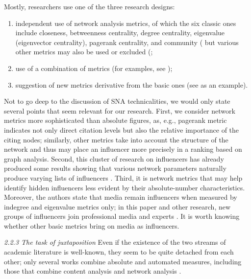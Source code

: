Mostly, researchers use one of the three research designs:
\begin{enumerate}
	\item independent use of network analysis metrics, of which the six classic ones include closeness, betweenness centrality, degree centrality, eigenvalue (eigenvector centrality), pagerank centrality, and community (\cite{DuboisGaffney,SanzMenendez} but various other metrics may also be used or excluded (\cite{DuboisGaffney,AlmindIngwersen,BlekanovMoskalets};
	\item use of a combination of metrics (for examples, see \cite{KwakLeePark,GonzalezBailonBorgeHolthoeferMoreno});
	\item suggestion of new metrics derivative from the basic ones (see \cite{MairederWeeksDeZuniga} as an example).
\end{enumerate}

Not to go deep to the discussion of SNA technicalities, we would only state several points that seem relevant for our research. First, we consider network metrics more sophisticated than absolute figures, as, e.g., pagerank metric indicates not only direct citation levels but also the relative importance of the citing nodes; similarly, other metrics take into account the structure of the network and thus may place an influencer more precisely in a ranking based on graph analysis. Second, this cluster of research on influencers has already produced some results showing that various network parameters naturally produce varying lists of influencers \cite{DuboisGaffney}. Third, it is network metrics that may help identify hidden influencers less evident by their absolute-number characteristics. Moreover, the authors \cite{DuboisGaffney} state that media remain influencers when measured by indegree and eigenvalue metrics only; in this paper and other research, new groups of influencers join professional media and experts \cite{HilbertVasquezHalpern}. It is worth knowing whether other basic metrics bring on media as influencers.

\textit{2.2.3 The task of juxtaposition}
Even if the existence of the two streams of academic literature is well-known, they seem to be quite detached from each other; only several works combine absolute and automated measures, including those that combine content analysis and network analysis \cite{Adam,GruzdRoy,XuSangBlasiola}.

